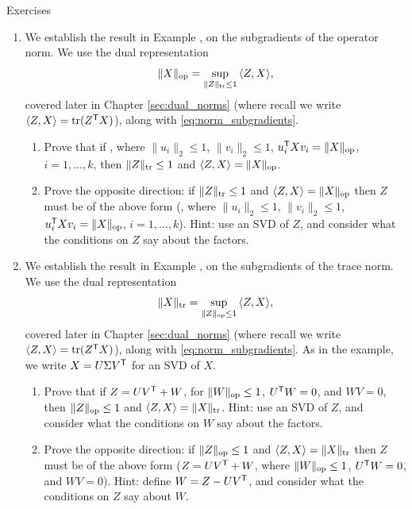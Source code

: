 \begin{xcb}{Exercises}
\begin{enumerate}[label=\thechapter.\arabic*]
\item \label{ex:operator_norm_subgradients}
  We establish the result in Example , on
  the subgradients of the operator norm. We use the dual representation
  \[
  \|X\|_{\mathrm{op}} = \sup_{\|Z\|_{\operatorname{tr}} \leq 1} \, \langle Z, X \rangle, 
  \]
  covered later in Chapter \ref{sec:dual_norms} (where recall we write $\langle
  Z, X \rangle = \operatorname{tr}(Z^{\mathsf{T}} X)$), along with \eqref{eq:norm_subgradients}.

\begin{enumerate}[label=\alph*.]
\item Prove that if , where $\|u_i\|_2 
  \leq 1$, $\|v_i\|_2 \leq 1$, $u_i^{\mathsf{T}} X v_i = \|X\|_{\mathrm{op}}$, $i=1,\ldots,k$,
  then $\|Z\|_{\operatorname{tr}} \leq 1$ and $\langle Z, X \rangle =  \|X\|_{\mathrm{op}}$.   

\item Prove the opposite direction: if $\|Z\|_{\operatorname{tr}} \leq 1$ and $\langle Z, X
  \rangle = \|X\|_{\mathrm{op}}$ then $Z$ must be of the above form (, where $\|u_i\|_2 \leq 1$, $\|v_i\|_2 \leq 1$,
  $u_i^{\mathsf{T}} X v_i = \|X\|_{\mathrm{op}}$, $i=1,\ldots,k$). Hint: use an SVD of $Z$, and
  consider what the conditions on $Z$ say about the factors.      
\end{enumerate}

\item \label{ex:trace_norm_subgradients} 
  We establish the result in Example , on the
  subgradients of the trace norm. We use the dual representation 
  \[
  \|X\|_{\operatorname{tr}} = \sup_{\|Z\|_{\mathrm{op}} \leq 1} \, \langle Z, X \rangle,
  \]
  covered later in Chapter \ref{sec:dual_norms} (where recall we write $\langle 
  Z, X \rangle = \operatorname{tr}(Z^{\mathsf{T}} X)$), along with \eqref{eq:norm_subgradients}. As in
  the example, we write $X = U \Sigma V^{\mathsf{T}}$ for an SVD of $X$. 

\begin{enumerate}[label=\alph*.]
\item Prove that if $Z = U V^{\mathsf{T}} + W$, for $\|W\|_{\mathrm{op}} \leq 1$, $U^{\mathsf{T}} W = 0$,
  and $W V = 0$, then $\|Z\|_{\mathrm{op}} \leq 1$ and $\langle Z, X \rangle =
  \|X\|_{\operatorname{tr}}$. Hint: use an SVD of $Z$, and consider what the conditions on $W$
  say about the factors.   

\item Prove the opposite direction: if $\|Z\|_{\mathrm{op}} \leq 1$ and $\langle Z, X
  \rangle = \|X\|_{\operatorname{tr}}$ then $Z$ must be of the above form ($Z = U V^{\mathsf{T}} + W$,  
  where $\|W\|_{\mathrm{op}} \leq 1$, $U^{\mathsf{T}} W = 0$, and $W V = 0$). Hint: define $W = Z
  - U V^{\mathsf{T}}$, and consider what the conditions on $Z$ say about $W$. 
\end{enumerate}


\end{enumerate}
\end{xcb}
